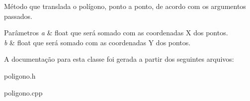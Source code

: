 Método que translada o polígono, ponto a ponto, de acordo com os argumentos passados. 


\begin{DoxyParams}{Parâmetros}
{\em a} & float que será somado com as coordenadas X dos pontos. \\
\hline
{\em b} & float que será somado com as coordenadas Y dos pontos. \\
\hline
\end{DoxyParams}


A documentação para esta classe foi gerada a partir dos seguintes arquivos\+:\begin{DoxyCompactItemize}
\item 
poligono.\+h\item 
poligono.\+cpp\end{DoxyCompactItemize}
